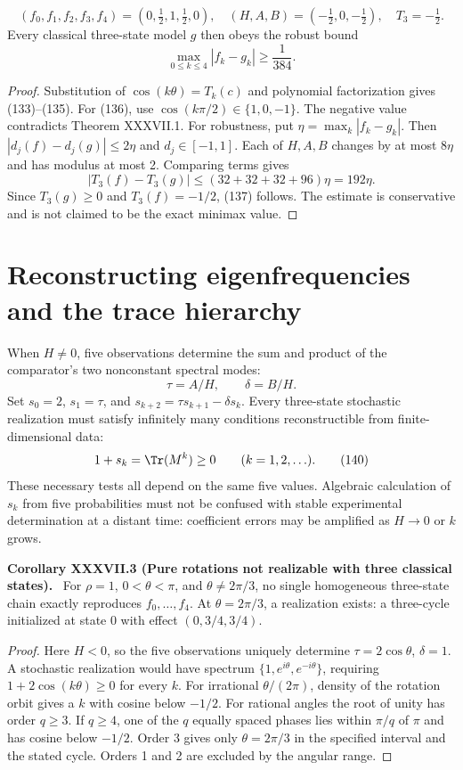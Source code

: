 \documentclass[11pt,a4paper,oneside]{book}
\newcommand{\statement}[3]{\par\medskip\noindent\textbf{#1 #2 (#3).}\ }
\begin{document}
\begin{equation}(f_0,f_1,f_2,f_3,f_4)=(0,\tfrac12,1,\tfrac12,0),\quad(H,A,B)=(-\tfrac12,0,-\tfrac12),\quad T_3=-\tfrac12.\tag{136}\end{equation}
Every classical three-state model $g$ then obeys the robust bound
\begin{equation}\max_{0\le k\le4}|f_k-g_k|\ge\frac1{384}.\tag{137}\end{equation}
\begin{proof}
Substitution of $\cos(k\theta)=T_k(c)$ and polynomial factorization gives (133)--(135). For (136), use $\cos(k\pi/2)\in\{1,0,-1\}$. The negative value contradicts Theorem XXXVII.1. For robustness, put $\eta=\max_k|f_k-g_k|$. Then $|d_j(f)-d_j(g)|\le2\eta$ and $d_j\in[-1,1]$. Each of $H,A,B$ changes by at most $8\eta$ and has modulus at most 2. Comparing terms gives
\begin{equation}|T_3(f)-T_3(g)|\le(32+32+32+96)\eta=192\eta.\tag{138}\end{equation}
Since $T_3(g)\ge0$ and $T_3(f)=-1/2$, (137) follows. The estimate is conservative and is not claimed to be the exact minimax value.
\end{proof}
\section{Reconstructing eigenfrequencies and the trace hierarchy}
When $H\ne0$, five observations determine the sum and product of the comparator's two nonconstant spectral modes:
\begin{equation}\tau=A/H,\qquad\delta=B/H.\tag{139}\end{equation}
Set $s_0=2$, $s_1=\tau$, and $s_{k+2}=\tau s_{k+1}-\delta s_k$. Every three-state stochastic realization must satisfy infinitely many conditions reconstructible from finite-dimensional data:
\begin{equation}1+s_k=\Tr(M^k)\ge0\qquad(k=1,2,\ldots).\tag{140}\end{equation}
These necessary tests all depend on the same five values. Algebraic calculation of $s_k$ from five probabilities must not be confused with stable experimental determination at a distant time: coefficient errors may be amplified as $H\to0$ or $k$ grows.
\statement{Corollary}{XXXVII.3}{Pure rotations not realizable with three classical states}
For $\rho=1$, $0<\theta<\pi$, and $\theta\ne2\pi/3$, no single homogeneous three-state chain exactly reproduces $f_0,\ldots,f_4$. At $\theta=2\pi/3$, a realization exists: a three-cycle initialized at state 0 with effect $(0,3/4,3/4)$.
\begin{proof}
Here $H<0$, so the five observations uniquely determine $\tau=2\cos\theta$, $\delta=1$. A stochastic realization would have spectrum $\{1,e^{i\theta},e^{-i\theta}\}$, requiring $1+2\cos(k\theta)\ge0$ for every $k$. For irrational $\theta/(2\pi)$, density of the rotation orbit gives a $k$ with cosine below $-1/2$. For rational angles the root of unity has order $q\ge3$. If $q\ge4$, one of the $q$ equally spaced phases lies within $\pi/q$ of $\pi$ and has cosine below $-1/2$. Order 3 gives only $\theta=2\pi/3$ in the specified interval and the stated cycle. Orders 1 and 2 are excluded by the angular range.
\end{proof}
\end{document}
